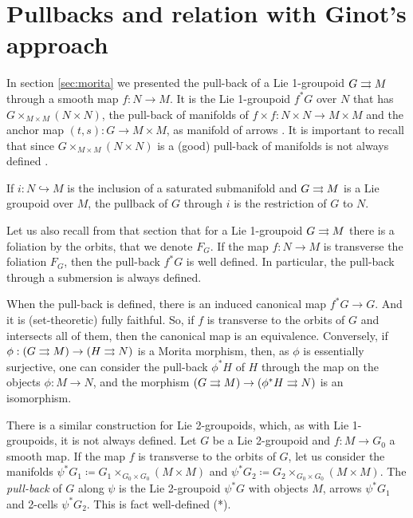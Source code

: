 %
%

\section{Pullbacks and relation with Ginot's approach}


In section \ref{sec:morita} we presented the pull-back of a Lie 1-groupoid $G\rightrightarrows M$ through a smooth map $f: N\to M$.
It is the Lie 1-groupoid $f^*G$ over $N$ that has $G\times_{M\times M} (N\times N)$, the pull-back of manifolds of $f\times f: N\times N\to M\times M$ and the anchor map $(t,s): G\to M\times M$, as manifold of arrows \cite{dh13, mm03}.
It is important to recall that since $G\times_{M\times M} (N\times N)$ is a (good) pull-back of manifolds is not always defined \cite{dh13}.

\begin{example}
If $i: N\hookrightarrow M$ is the inclusion of a saturated submanifold and $G\rightrightarrows M$ is a Lie groupoid over $M$, the pullback of $G$ through $i$ is the restriction of $G$ to $N$.
\end{example}

Let us also recall from that section that for a Lie 1-groupoid $G\rightrightarrows M$ there is a foliation by the orbits, that we denote $F_G$.
If the map $f: N\to M$ is transverse the foliation $F_G$, then the pull-back $f^*G$ is well defined.
In particular, the pull-back through a submersion is always defined.

When the pull-back is defined, there is an induced canonical map $f^*G\to G$.
And it is (set-theoretic) fully faithful.
So, if $f$ is transverse to the orbits of $G$ and intersects all of them, then the canonical map is an equivalence.
Conversely, if $\phi: (G\rightrightarrows M)\to (H\rightrightarrows N)$ is a Morita morphism, then, as $\phi$ is essentially surjective, one can consider the pull-back $\phi^*H$ of $H$ through the map on the objects $\phi: M\to N$, and the morphism $(G\rightrightarrows M)\to (\phi^*H\rightrightarrows N)$ is an isomorphism.

There is a similar construction for Lie 2-groupoids, which, as with Lie 1-groupoids, it is not always defined.
Let $G$ be a Lie 2-groupoid and $f: M\to G_0$ a smooth map.
If the map $f$ is transverse to the orbits of $G$, let us consider the manifolds $\psi^*G_1 \coloneqq G_1\times_{G_0\times G_0}(M\times M)$ and $\psi^*G_2 \coloneqq G_2\times_{G_0\times G_0}(M\times M)$.
The \emph{pull-back} of $G$ along $\psi$ is the Lie 2-groupoid $\psi^*G$ with objects $M$, arrows $\psi^*G_1$ and 2-cells $\psi^*G_2$.
This is fact well-defined (*).

